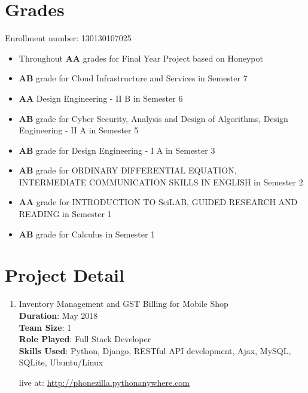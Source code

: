\documentclass[a4paper, 14pt]{article}
\begin{document}
	\section*{Grades}
	Enrollment number: 130130107025
	\begin{itemize}
		\item Throughout \textbf{AA} grades for Final Year Project based on Honeypot
		\item \textbf{AB} grade for Cloud Infrastructure and Services in Semester 7
		\item \textbf{AA} Design Engineering - II B in Semester 6
		\item \textbf{AB} grade for Cyber Security, Analysis and Design of Algorithms, Design Engineering - II A in Semester 5
		\item \textbf{AB} grade for Design Engineering - I A in Semester 3
		\item \textbf{AB} grade for ORDINARY DIFFERENTIAL EQUATION, INTERMEDIATE COMMUNICATION SKILLS IN ENGLISH in Semester 2
		\item \textbf{AA} grade for INTRODUCTION TO SciLAB, GUIDED RESEARCH AND READING in Semester 1
		\item \textbf{AB} grade for Calculus in Semester 1
	\end{itemize}	
	\section*{Project Detail}
	
	
	
	\begin{enumerate}[start=1,label={\bfseries $\Rightarrow$ TITLE - }]
		\addtolength{\itemindent}{40pt}
		\item Inventory Management and GST Billing for Mobile Shop
		\\ \textbf{Duration}: May 2018
		\\ \textbf{Team Size}: 1
		\\ \textbf{Role Played}: Full Stack Developer
		\\ \textbf{Skills Used}: Python, Django, RESTful API development, Ajax, MySQL, SQLite, Ubuntu/Linux
		
		live at: \url{http://phonezilla.pythonanywhere.com}
	\end{enumerate}
	
\end{document}
